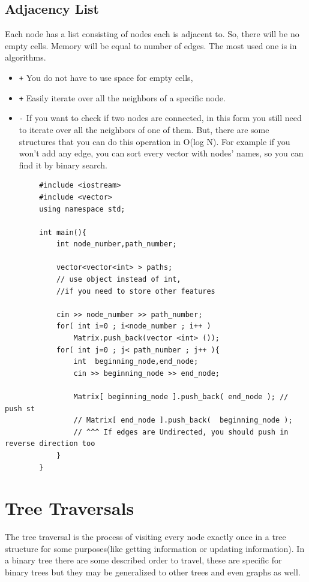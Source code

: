 \documentclass[12pt]{article}
\begin{document}
    \subsection{Adjacency List}
    Each node has a list consisting of nodes each is adjacent to. So, there will be no empty cells. Memory will be equal to number of edges. The most used one is in algorithms. \cite{16}
        \begin{itemize}
             \item \texttt + You do not have to use space for empty cells, 
    
             \item \texttt + Easily iterate over all the neighbors of a specific node.
             \item \texttt - If you want to check if two nodes are connected, in this form you still need to iterate over all the neighbors of one of them. But, there are some structures that you can do this operation in O(log N). For example if you won't add any edge, you can sort every vector with nodes' names, so you can find it by binary search.  
            
         \end{itemize} 
        \begin{verbatim}
        #include <iostream>
        #include <vector>
        using namespace std;
        
        int main(){
            int node_number,path_number;
            
            vector<vector<int> > paths; 
            // use object instead of int, 
            //if you need to store other features
            
            cin >> node_number >> path_number;
            for( int i=0 ; i<node_number ; i++ )
                Matrix.push_back(vector <int> ());
            for( int j=0 ; j< path_number ; j++ ){
                int  beginning_node,end_node;
                cin >> beginning_node >> end_node;
                
                Matrix[ beginning_node ].push_back( end_node ); // push st
                // Matrix[ end_node ].push_back(  beginning_node ); 
                // ^^^ If edges are Undirected, you should push in reverse direction too
            }
        }
        \end{verbatim}
\section{Tree Traversals}
     The tree traversal is the process of visiting every node exactly once in a tree structure  for some purposes(like getting information or updating information). In a binary tree there are some described order to travel, these are specific for binary trees but they may be generalized to other trees and even graphs as well. \cite{Traversal}
\end{document}
